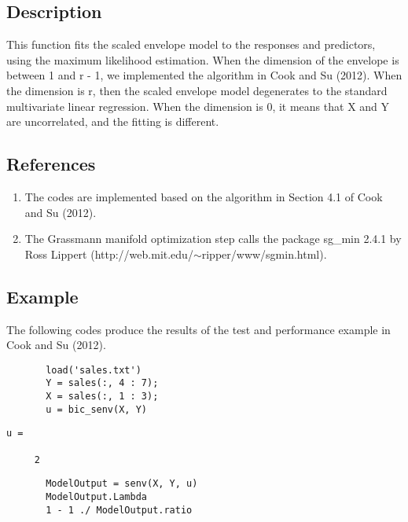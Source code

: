 \documentclass[a4paper,11pt,openany]{memoir}
\begin{document}
\subsection*{Description}

\begin{par}
This function fits the scaled envelope model to the responses and predictors, using the maximum likelihood estimation.  When the dimension of the envelope is between 1 and r - 1, we implemented the algorithm in Cook and Su (2012).  When the dimension is r, then the scaled envelope model degenerates to the standard multivariate linear regression.  When the dimension is 0, it means that X and Y are uncorrelated, and the fitting is different.
\end{par} \vspace{1em}


\subsection*{References}

\begin{enumerate}
\setlength{\itemsep}{-1ex}
   \item The codes are implemented based on the algorithm in Section 4.1 of Cook and Su (2012).
   \item The Grassmann manifold optimization step calls the package sg\_min 2.4.1 by Ross Lippert (http://web.mit.edu/$\sim$ripper/www/sgmin.html).
\end{enumerate}


\subsection*{Example}

\begin{par}
The following codes produce the results of the test and performance example in Cook and Su (2012).
\end{par} \vspace{1em}

\begin{verbatim}       load('sales.txt')
       Y = sales(:, 4 : 7);
       X = sales(:, 1 : 3);
       u = bic_senv(X, Y)\end{verbatim}    
        \color{lightgray}\ttfamily \begin{verbatim}
u =

     2
\end{verbatim} \rmfamily
\color{black}       
       \begin{verbatim}
       ModelOutput = senv(X, Y, u)
       ModelOutput.Lambda
       1 - 1 ./ ModelOutput.ratio\end{verbatim}
\end{document}
